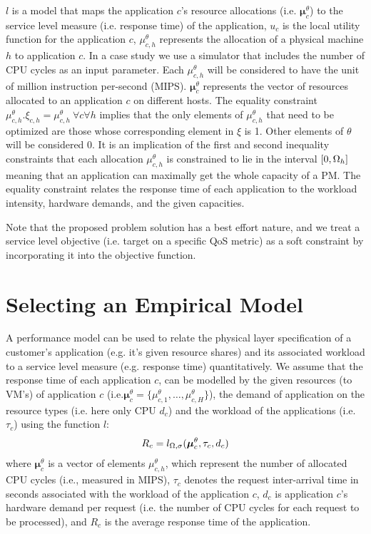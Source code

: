 $l$ is a model that maps the application $c$'s resource allocations (i.e. $\boldsymbol\mu^\theta_{c}$) to the service level measure (i.e. response time) of the application, $u_c$ is the local utility function for the application $c$, $\mu^\theta_{c,h}$ represents the allocation of a physical machine $h$ to application $c$. 
In a case study we use a simulator that includes the number of CPU cycles as an input parameter. Each $\mu^\theta_{c,h}$ will be considered to have the unit of million instruction per-second (MIPS). $\boldsymbol\mu^\theta_{c}$ represents the vector of resources allocated to an application $c$ on different hosts. 
The equality constraint $\mu^\theta_{c,h}.\xi_{c,h}=\mu^\theta_{c,h} \  \forall c \forall h$ implies that the only elements of $\mu^\theta_{c,h}$ that need to be optimized are those whose corresponding element in $\xi$ is 1. Other elements of $\theta$ will be considered 0. It is an implication of the first and second inequality constraints that each allocation $\mu^\theta_{c,h}$ is constrained to lie in the interval $[0,\Omega_h]$ meaning that an application can maximally get the whole capacity of a PM. The equality constraint relates the response time of each application to the workload intensity, hardware demands, and the given capacities.

Note that the proposed problem solution has a best effort nature, and we treat a service level objective (i.e. target on a specific QoS metric) as a soft constraint by incorporating it into the objective function. 

\section{Selecting an Empirical Model}
A performance model can be used to relate the physical layer specification of a customer's application (e.g. it's given resource shares) and its associated workload to a service level measure (e.g. response time) quantitatively.    
We assume that the response time of each application $c$, can be modelled by the given resources (to VM's) of application $c$ (i.e.$\boldsymbol\mu^\theta_{c}=\{\mu^\theta_{c,1},\dots ,\mu^\theta_{c,H}\}$), the demand of application on the resource types (i.e. here only CPU $d_c$) and the workload of the applications (i.e. $\tau_c$) using the function $l$:
\begin{equation} \label{eq:perf-model_general}
\begin{split}
	R_c=l_{\Omega,\sigma}(\boldsymbol\mu^\theta_{c} ,\tau_c,d_{c}) 
	\end{split}
\end{equation} 
 where $\boldsymbol\mu^\theta_{c}$ is a vector of elements $\mu^\theta_{c,h}$, which represent the number of allocated CPU cycles (i.e., measured in MIPS), ${\tau }_c$ denotes the request inter-arrival time in seconds associated with the workload of the application $c$, $d_c$ is application $c$'s hardware demand per request (i.e. the number of CPU cycles for each request to be processed), and $R_c$ is the average response time of the application.

